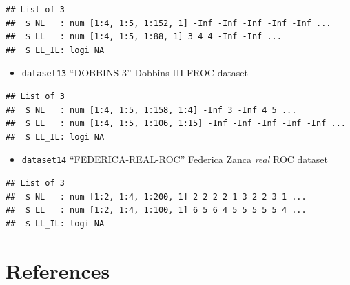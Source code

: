 \documentclass[
]{book}
\providecommand{\tightlist}{%
  \setlength{\itemsep}{0pt}\setlength{\parskip}{0pt}}
\begin{document}
\begin{verbatim}
## List of 3
##  $ NL   : num [1:4, 1:5, 1:152, 1] -Inf -Inf -Inf -Inf -Inf ...
##  $ LL   : num [1:4, 1:5, 1:88, 1] 3 4 4 -Inf -Inf ...
##  $ LL_IL: logi NA
\end{verbatim}

\begin{itemize}
\tightlist
\item
  \texttt{dataset13} ``DOBBINS-3'' Dobbins III FROC dataset \citep{Dobbins2016MultiInstitutional}
\end{itemize}

\begin{verbatim}
## List of 3
##  $ NL   : num [1:4, 1:5, 1:158, 1:4] -Inf 3 -Inf 4 5 ...
##  $ LL   : num [1:4, 1:5, 1:106, 1:15] -Inf -Inf -Inf -Inf -Inf ...
##  $ LL_IL: logi NA
\end{verbatim}

\begin{itemize}
\tightlist
\item
  \texttt{dataset14} ``FEDERICA-REAL-ROC'' Federica Zanca \emph{real} ROC dataset \citep{RN2318}
\end{itemize}

\begin{verbatim}
## List of 3
##  $ NL   : num [1:2, 1:4, 1:200, 1] 2 2 2 2 1 3 2 2 3 1 ...
##  $ LL   : num [1:2, 1:4, 1:100, 1] 6 5 6 4 5 5 5 5 5 4 ...
##  $ LL_IL: logi NA
\end{verbatim}

\hypertarget{datasets-references}{%
\section{References}\label{datasets-references}}

  
\end{document}
